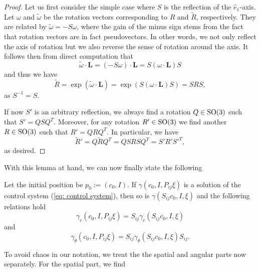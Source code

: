 \begin{proof}
Let us first consider the simple case where $S$ is the reflection of the $\hat{e}_1$-axis. Let $\omega$ and $\tilde{\omega}$ be the rotation vectors corresponding to $R$ and $\tilde{R}$, respectively. They are related by $\tilde{\omega} = -S \omega$, where the gain of the minus sign stems from the fact that rotation vectors are in fact pseudovectors. In other words, we not only reflect the axis of rotation but we also reverse the sense of rotation around the axis. It follows then from direct computation that
\begin{equation}
\label{eq: transformation of rotation axis}
 \tilde{\omega} \cdot \mathbf{L} = (-S\omega) \cdot \mathbf{L} = S(\omega \cdot \mathbf{L})S
\end{equation}
and thus we have
\begin{equation}
\tilde{R} = \exp(\tilde{\omega} \cdot \mathbf{L}) = \exp(S(\omega \cdot \mathbf{L})S) = SRS,
\end{equation}
as $S^{-1} = S$.

If now $S'$ is an arbitrary reflection, we always find a rotation $Q \in \operatorname{SO}(3)$ such that $S' = Q S Q^T$. Moreover, for any rotation $R' \in \operatorname{SO}(3)$ we find another $R \in \operatorname{SO}(3)$ such that $R' = Q R Q^T$. In particular, we have
\begin{equation}
\tilde{R}' = Q \tilde{R} Q^T = Q SRS Q^T = S' R' S'^T,
\end{equation}
as desired.
\end{proof}

With this lemma at hand, we can now finally state the following

\begin{condition}
\label{cond:swap}
Let the initial position be $p_0 := (c_0, I)$. If $\gamma(c_0, I, P_{ij} \xi)$ is a solution of the control system (\ref{eq: control system}), then so is $\gamma(S_{ij}c_0, I, \xi)$ and the following relations hold
\begin{equation}
	\gamma_c(c_0, I, P_{ij} \xi) = S_{ij} \gamma_c(S_{ij}c_0, I, \xi)
\end{equation}
and
\begin{equation}
	\gamma_{\theta}(c_0, I, P_{ij} \xi ) = S_{ij} \gamma_{\theta} (S_{ij} c_0, I, \xi) S_{ij}.
\end{equation}
\end{condition}
To avoid chaos in our notation, we treat the the spatial and angular parts now separately. For the spatial part, we find

